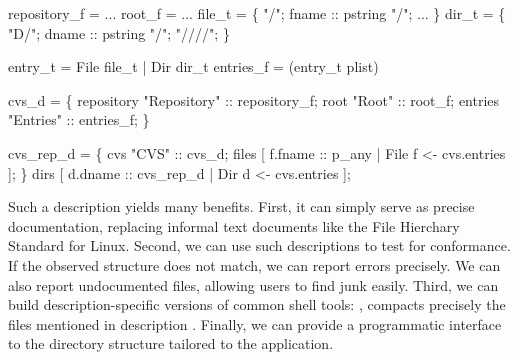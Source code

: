 \documentclass[nocopyrightspace,10pt]{sigplanconf}
\begin{document}
\begin{tightcode}
 repository_f = ...
 root_f = ...
 file_t =  
  \{ "/";   fname :: pstring "/";   ... \}
 dir_t =  
  \{ "D/";  dname :: pstring "/";  "////"; \} 

 entry_t = File  file_t | Dir  dir_t 
 entries_f =  (entry_t plist)

 cvs_d =  \{
  repository  "Repository" :: repository_f;
  root        "Root"       :: root_f;
  entries     "Entries"    :: entries_f; \}

 cvs_rep_d =  \{
  cvs    "CVS" :: cvs_d;
  files  [ f.fname :: p_any      | 
                  File f <- cvs.entries ]; \}
  dirs   [ d.dname :: cvs_rep_d | 
                  Dir  d <- cvs.entries ];
\end{tightcode}
Such a description yields many benefits.  First, it can simply
serve as precise documentation, replacing
informal text documents like the File Hierchary Standard for Linux.
Second, we can use such descriptions to test for conformance.
If the observed structure does not match, we can report errors
precisely.  We can also report undocumented files, allowing users
to find junk easily.  Third, we can build description-specific
versions of common shell tools: \eg{},  compacts
precisely the files 
mentioned in description .  
Finally, we can provide a programmatic interface to
the directory structure tailored to the application. 


%


\end{document}
